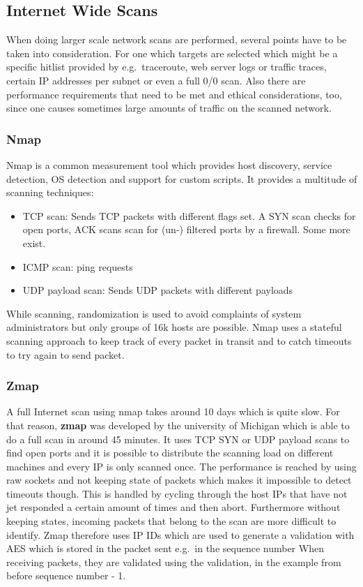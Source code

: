 \subsection{Internet Wide Scans}
When doing larger scale network scans are performed, several points have to be taken into consideration.
For one which targets are selected which might be a specific hitlist provided by e.g.\ traceroute, web server logs or traffic traces, certain IP addresses per subnet or even a full 0/0 scan.
Also there are performance requirements that need to be met and ethical considerations, too, since one causes sometimes large amounts of traffic on the scanned network.\\
\vspace{4pt}

\subsubsection*{Nmap}
Nmap is a common measurement tool which provides host discovery, service detection, OS detection and support for custom scripts.
It provides a multitude of scanning techniques:
\begin{itemize}
  \item TCP scan: Sends TCP packets with different flags set. A SYN scan checks for open ports, ACK scans scan for (un-) filtered ports by a firewall. Some more exist.
  \item ICMP scan: ping requests
  \item UDP payload scan: Sends UDP packets with different payloads
\end{itemize}
While scanning, randomization is used to avoid complaints of system administrators but only groups of 16k hosts are possible.
Nmap uses a stateful scanning approach to keep track of every packet in transit and to catch timeouts to try again to send packet.\\

\subsubsection*{Zmap}
A full Internet scan using nmap takes around 10 days which is quite slow.
For that reason, \textbf{zmap} was developed by the university of Michigan which is able to do a full scan in around 45 minutes.
It uses TCP SYN or UDP payload scans to find open ports and it is possible to distribute the scanning load on different machines and every IP is only scanned once.
The performance is reached by using raw sockets and not keeping state of packets which makes it impossible to detect timeouts though.
This is handled by cycling through the host IPs that have not jet responded a certain amount of times and then abort.
Furthermore without keeping states, incoming packets that belong to the scan are more difficult to identify.
Zmap therefore uses IP IDs which are used to generate a validation with AES which is stored in the packet sent e.g.\ in the sequence number
When receiving packets, they are validated using the validation, in the example from before sequence number - 1.

